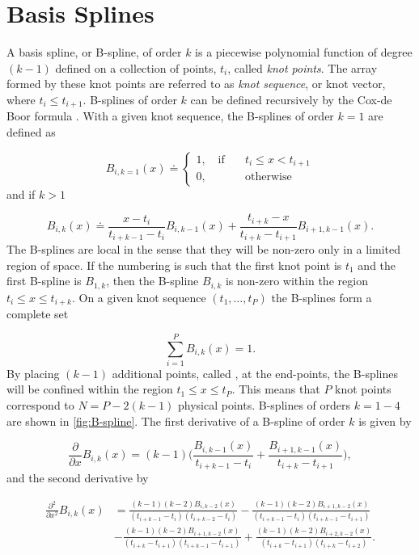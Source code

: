 \chapter{Basis Splines}\label{B-splines}
A basis spline, or B-spline, of order $k$ is a piecewise polynomial function of degree $(k-1)$ defined on a collection of points, $t_i$, called \textit{knot points}. The array formed by these knot points are referred to as \textit{knot sequence}, or knot vector, where $t_i\leq t_{i+1}$. B-splines of order $k$ can be defined recursively by the Cox-de Boor formula \cite{deboor}. With a given knot sequence, the B-splines of order $k=1$ are defined as

\begin{equation}
B_{i,k=1}(x) \doteq
\begin{cases}
1, \quad \text{if} \quad & t_i \leq x < t_{i+1}\\
0,& \text{otherwise} 
\end{cases}
\end{equation}
and if $k>1$

\begin{equation}
B_{i,k}(x) \doteq \frac{x-t_i}{t_{i+k-1}-t_i}B_{i,k-1}(x) + \frac{t_{i+k}-x}{t_{i+k}-t_{i+1}}B_{i+1,k-1}(x).
\end{equation}
The B-splines are local in the sense that they will be non-zero only in a limited region of space. If the numbering is such that the first knot point is $t_1$ and the first  B-spline is $B_{1,k}$, then the B-spline $B_{i,k}$ is non-zero within the region $t_i \leq x \leq t_{i+k}$. On a given knot sequence $(t_1,\ldots , t_P)$ the B-splines form a complete set

\begin{equation}
\sum_{i=1}^{P} B_{i,k}(x) = 1.
\end{equation}
By placing $(k-1)$ additional points, called , at the end-points, the B-splines will be confined within the region $t_1 \leq x \leq t_P$. This means that $P$ knot points correspond to $N=P-2(k-1)$ physical points. B-splines of orders $k=1-4$ are shown in \cref{fig:B-spline}. The first derivative of a B-spline of order $k$ is given by

\begin{equation}
\frac{\partial}{\partial x}B_{i,k}(x) = (k-1)\bigg(\frac{B_{i,k-1}(x)}{t_{i+k-1}-t_i} + \frac{B_{i+1,k-1}(x)}{t_{i+k}-t_{i+1}}\bigg),
\end{equation}
and the second derivative by

\begin{align}
\frac{\partial^2}{\partial x^2}B_{i,k}(x) &= \frac{(k-1)(k-2)B_{i,k-2}(x)}{(t_{i+k-1}-t_i)(t_{i+k-2}-t_i)} - \frac{(k-1)(k-2)B_{i+1,k-2}(x)}{(t_{i+k-1}-t_i)(t_{i+k-1}-t_{i+1})}\nonumber\\
&- \frac{(k-1)(k-2)B_{i+1,k-2}(x)}{(t_{i+k}-t_{i+1})(t_{i+k-1}-t_{i+1})} +  \frac{(k-1)(k-2)B_{i+2,k-2}(x)}{(t_{i+k}-t_{i+1})(t_{i+k}-t_{i+2})}.
\end{align}

